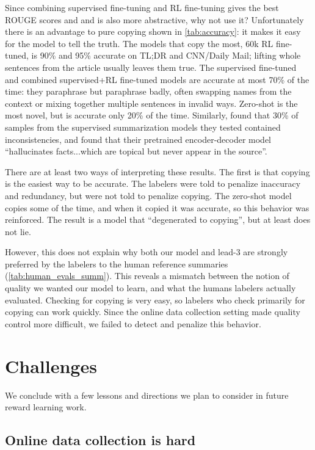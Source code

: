 \documentclass{article}
\begin{document}
Since combining supervised fine-tuning and RL fine-tuning gives the best ROUGE scores and and is also more abstractive, why not use it?  Unfortunately there is an advantage to pure copying shown in \cref{tab:accuracy}: it makes it easy for the model to tell the truth.  The models that copy the most, 60k RL fine-tuned, is 90\% and 95\% accurate on TL;DR and CNN/Daily Mail; lifting whole sentences from the article usually leaves them true.  The supervised fine-tuned and combined supervised+RL fine-tuned models are accurate at most 70\% of the time: they paraphrase but paraphrase badly, often swapping names from the context or mixing together multiple sentences in invalid ways.  Zero-shot is the most novel, but is accurate only 20\% of the time.  Similarly, \citet{kryscinski2019neural} found that 30\% of samples from the supervised summarization models they tested contained inconsistencies, and \citet{khandelwal2019sample} found that their pretrained encoder-decoder model ``hallucinates facts...which are topical but never appear in the source''.

There are at least two ways of interpreting these results.  The first is that copying is the easiest way to be accurate.  The labelers were told to penalize inaccuracy and redundancy, but were not told to penalize copying.  The zero-shot model copies some of the time, and when it copied it was accurate, so this behavior was reinforced.  The result is a model that ``degenerated to copying'', but at least does not lie.

However, this does not explain why both our model and lead-3 are strongly preferred by the labelers to the human reference summaries (\cref{tab:human_evals_summ}). This reveals a mismatch between the notion of quality we wanted our model to learn,
and what the humans labelers actually evaluated. Checking for copying is very easy, so labelers who check primarily for copying can work quickly.  Since the online data collection setting made quality control more difficult, we failed to detect and penalize this behavior.

\section{Challenges \label{sec:challenges}}

We conclude with a few lessons and directions we plan to consider in future reward learning work.

\subsection{Online data collection is hard}
\end{document}
